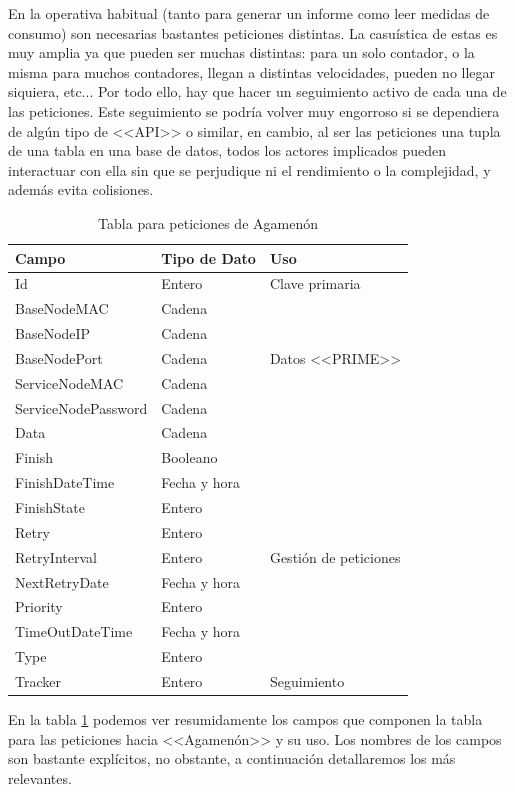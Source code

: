 En la operativa habitual (tanto para generar un informe como leer medidas de consumo) son necesarias bastantes peticiones distintas. La casuística de estas es muy amplia ya que pueden ser muchas distintas: para un solo contador, o la misma para muchos contadores, llegan a distintas velocidades, pueden no llegar siquiera, etc... Por todo ello, hay que hacer un seguimiento activo de cada una de las peticiones. Este seguimiento se podría volver muy engorroso si se dependiera de algún tipo de <<API>> o similar, en cambio, al ser las peticiones una tupla de una tabla en una base de datos, todos los actores implicados pueden interactuar con ella sin que se perjudique ni el rendimiento o la complejidad, y además evita colisiones.

\begin{table}[htbp]
	\centering
	\begin{tabular}{lll}
		\toprule
		Campo & Tipo de Dato & Uso\\ \toprule
		Id & Entero & Clave primaria \\ \cline{3-3}
		BaseNodeMAC & Cadena & \multirow{5}{*}{Datos <<PRIME>>} \\ 
		BaseNodeIP & Cadena & \\
		BaseNodePort & Cadena & \\
		ServiceNodeMAC & Cadena & \\
		ServiceNodePassword & Cadena & \\
		Data & Cadena & \\ \cline{3-3}
		Finish & Booleano & \multirow{9}{*}{Gestión de peticiones}\\
		FinishDateTime & Fecha y hora & \\
		FinishState & Entero & \\
		Retry & Entero & \\
		RetryInterval & Entero & \\
		NextRetryDate & Fecha y hora & \\
		Priority & Entero & \\
		TimeOutDateTime & Fecha y hora & \\
		Type & Entero & \\ \cline{3-3}
		Tracker & Entero & Seguimiento\\
		\bottomrule
	\end{tabular}
	\caption{Tabla para peticiones de Agamenón}
	\label{tab:DiagramaTablaAgamenon}
\end{table}

En la tabla \ref{tab:DiagramaTablaAgamenon} podemos ver resumidamente los campos que componen la tabla para las peticiones hacia <<Agamenón>> y su uso. Los nombres de los campos son bastante explícitos, no obstante, a continuación detallaremos los más relevantes.

